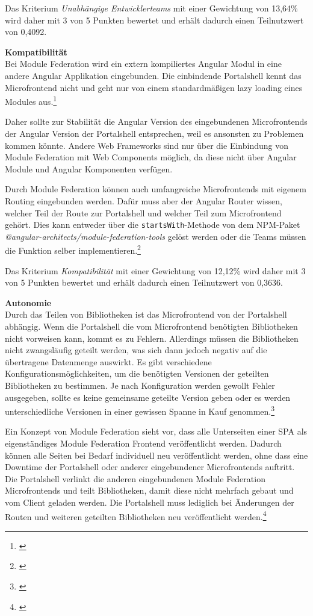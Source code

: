 Das Kriterium \textit{Unabhängige Entwicklerteams} mit einer Gewichtung von 13,64\% wird daher mit 3 von 5 Punkten bewertet und erhält dadurch einen Teilnutzwert von 0,4092.

\textbf{Kompatibilität}\\
Bei Module Federation wird ein extern kompiliertes Angular Modul in eine andere Angular Applikation eingebunden. Die einbindende Portalshell kennt das Microfrontend nicht und geht nur von einem standardmäßigen lazy loading eines Modules aus.\footnote{\cite[vgl.][]{Steyer2021a}}

Daher sollte zur Stabilität die Angular Version des eingebundenen Microfrontends der Angular Version der Portalshell entsprechen, weil es ansonsten zu Problemen kommen könnte. Andere Web Frameworks sind nur über die Einbindung von Module Federation mit Web Components möglich, da diese nicht über Angular Module und Angular Komponenten verfügen.

Durch Module Federation können auch umfangreiche Microfrontends mit eigenem Routing eingebunden werden. Dafür muss aber der Angular Router wissen, welcher Teil der Route zur Portalshell und welcher Teil zum Microfrontend gehört. Dies kann entweder über die \texttt{startsWith}-Methode von dem \gls{NPM}-Paket \textit{@angular-architects/module-federation-tools} gelöst werden oder die Teams müssen die Funktion selber implementieren.\footnote{\cite[vgl.][]{Steyer2021a}}

Das Kriterium \textit{Kompatibilität} mit einer Gewichtung von 12,12\% wird daher mit 3 von 5 Punkten bewertet und erhält dadurch einen Teilnutzwert von 0,3636.

\textbf{Autonomie}\\
Durch das Teilen von Bibliotheken ist das Microfrontend von der Portalshell abhängig. Wenn die Portalshell die vom Microfrontend benötigten Bibliotheken nicht vorweisen kann, kommt es zu Fehlern. Allerdings müssen die Bibliotheken nicht zwangsläufig geteilt werden, was sich dann jedoch negativ auf die übertragene Datenmenge auswirkt. Es gibt verschiedene Konfigurationsmöglichkeiten, um die benötigten Versionen der geteilten Bibliotheken zu bestimmen. Je nach Konfiguration werden gewollt Fehler ausgegeben, sollte es keine gemeinsame geteilte Version geben oder es werden unterschiedliche Versionen in einer gewissen Spanne in Kauf genommen.\footnote{\cite[vgl.][]{Steyer2021e}}

Ein Konzept von Module Federation sieht vor, dass alle Unterseiten einer \gls{SPA} als eigenständiges Module Federation Frontend veröffentlicht werden. Dadurch können alle Seiten bei Bedarf individuell neu veröffentlicht werden, ohne dass eine Downtime der Portalshell oder anderer eingebundener Microfrontends auftritt. Die Portalshell verlinkt die anderen eingebundenen Module Federation Microfrontends und teilt Bibliotheken, damit diese nicht mehrfach gebaut und vom Client geladen werden. Die Portalshell muss lediglich bei Änderungen der Routen und weiteren geteilten Bibliotheken neu veröffentlicht werden.\footnote{\cite[vgl.][]{Webpack2020b}}

